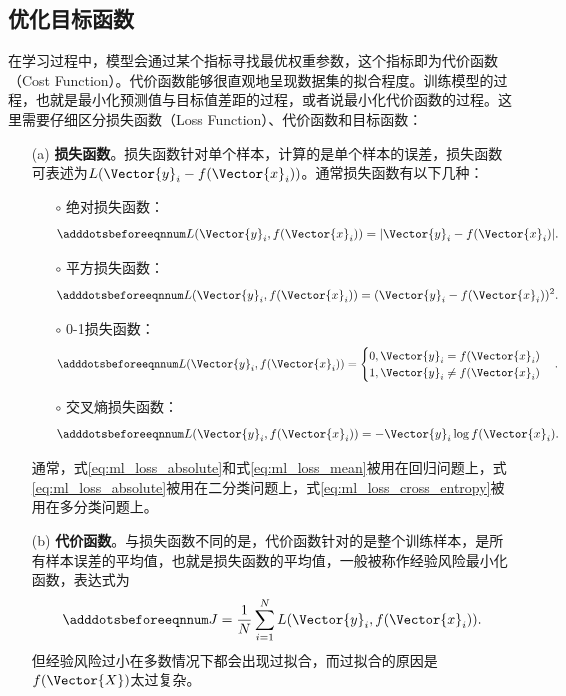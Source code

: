 \subsection{优化目标函数}\label{sec:ml_loss}

在学习过程中，模型会通过某个指标寻找最优权重参数，这个指标即为代价函数（Cost Function）。代价函数能够很直观地呈现数据集的拟合程度。训练模型的过程，也就是最小化预测值与目标值差距的过程，或者说最小化代价函数的过程。这里需要仔细区分损失函数（Loss Function）、代价函数和目标函数：
\begin{itemize}
  \item[(a)] \textbf{损失函数}。损失函数针对单个样本，计算的是单个样本的误差，损失函数可表述为$L(\Vector{y}_i-f(\Vector{x}_i))$。通常损失函数有以下几种：
  \begin{enumerate}
    \item[$\circ$] 绝对损失函数：
    \begin{equation}\adddotsbeforeeqnnum
      \label{eq:ml_loss_absolute}
      L(\Vector{y}_i,f(\Vector{x}_i))=|\Vector{y}_i-f(\Vector{x}_i)|.
    \end{equation}
    \item[$\circ$] 平方损失函数：
    \begin{equation}\adddotsbeforeeqnnum
      \label{eq:ml_loss_mean}
      L(\Vector{y}_i,f(\Vector{x}_i))=(\Vector{y}_i-f(\Vector{x}_i))^2.
    \end{equation}
    \item[$\circ$] 0-1损失函数：
    \begin{equation}\adddotsbeforeeqnnum
      \label{eq:ml_loss_01}
      L(\Vector{y}_i,f(\Vector{x}_i))=
      \begin{cases}
        0, \Vector{y}_i=f(\Vector{x}_i)\\
        1, \Vector{y}_i\neq f(\Vector{x}_i)
      \end{cases}.
    \end{equation}
    \item[$\circ$] 交叉熵损失函数：
    \begin{equation}\adddotsbeforeeqnnum
      \label{eq:ml_loss_cross_entropy}
      L(\Vector{y}_i,f(\Vector{x}_i))=-\Vector{y}_i\log f(\Vector{x}_i).
    \end{equation}
  \end{enumerate}
  通常，式\ref{eq:ml_loss_absolute}和式\ref{eq:ml_loss_mean}被用在回归问题上，式\ref{eq:ml_loss_absolute}被用在二分类问题上，式\ref{eq:ml_loss_cross_entropy}被用在多分类问题上。

  \item[(b)] \textbf{代价函数}。与损失函数不同的是，代价函数针对的是整个训练样本，是所有样本误差的平均值，也就是损失函数的平均值，一般被称作经验风险最小化函数，表达式为
  \begin{equation}\adddotsbeforeeqnnum
    \label{eq:ml_loss_experience}
    J=\frac{1}{N}\sum_{i=1}^{N}L(\Vector{y}_i,f(\Vector{x}_i)).
  \end{equation}
  但经验风险过小在多数情况下都会出现过拟合，而过拟合的原因是$f(\Vector{X})$太过复杂。


\end{itemize}
